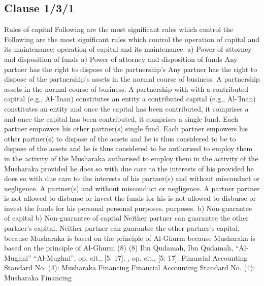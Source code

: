 \documentclass{article}%
\begin{document}
\subsection{Clause 1/3/1}%
\label{subsec:Clause1/3/1}%
Rules of capital   Following are the most significant rules which control the    Following are the most significant rules which control the  operation of capital and its maintenance: operation of capital and its maintenance: a) Power of attorney and disposition of funds a) Power of attorney and disposition of funds  Any partner has the right to dispose of the partnership’s   Any partner has the right to dispose of the partnership’s  assets in the normal course of business. A partnership  assets in the normal course of business. A partnership with  with  a contributed capital (e.g., Al-’Inan) constitutes an entity  a contributed capital (e.g., Al-’Inan) constitutes an entity  and once the capital has been contributed, it comprises a  and once the capital has been contributed, it comprises a  single fund. Each partner empowers his other partner(s)  single fund. Each partner empowers his other partner(s)  to dispose of the assets and he is thus considered to be  to dispose of the assets and he is thus considered to be  authorised to employ them in the activity of the Musharaka  authorised to employ them in the activity of the Musharaka  provided he does so with due care to the interests of his  provided he does so with due care to the interests of his  partner(s) and without misconduct or negligence. A  partner(s) and without misconduct or negligence. A partner  partner  is not allowed to disburse or invest the funds for his  is not allowed to disburse or invest the funds for his personal  personal  purposes. purposes. b) Non-guarantee of capital b) Non-guarantee of capital  Neither partner can guarantee the other partner’s capital,   Neither partner can guarantee the other partner’s capital,  because Musharaka is based on the principle of Al-Ghurm  because Musharaka is based on the principle of Al-Ghurm  (8) (8) Ibn Qudamah,   Ibn Qudamah, “Al-Mughni” “Al-Mughni”, op. cit., [5: 17]. , op. cit., [5: 17]. Financial Accounting Standard No. (4): Musharaka Financing Financial Accounting Standard No. (4): Musharaka Financing

%
\end{document}
